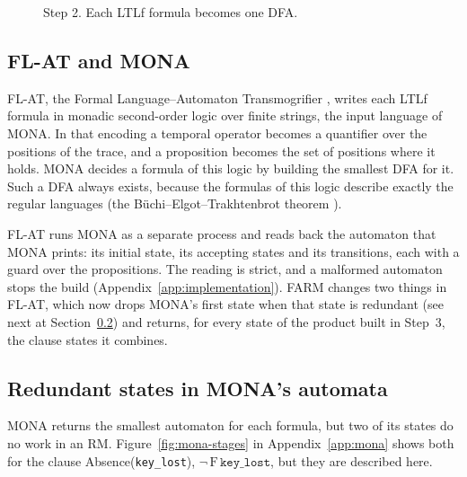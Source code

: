 \documentclass[11pt,english,listoffigures,listoftables]{tfgetsinf}
\begin{document}
\begin{figure}[H]
\centering
{}
\caption[Step 2 of FARM]{Step 2. Each LTLf formula becomes one DFA.}
\label{fig:step2}
\end{figure}

\subsection{FL-AT and MONA}
FL-AT, the Formal Language--Automaton Transmogrifier \cite{transmogrifier2020}, writes each LTLf formula in monadic second-order logic over finite strings, the input language of MONA. In that encoding a temporal operator becomes a quantifier over the positions of the trace, and a proposition becomes the set of positions where it holds. MONA \cite{henriksen1995mona} decides a formula of this logic by building the smallest DFA for it. Such a DFA always exists, because the formulas of this logic describe exactly the regular languages (the Büchi--Elgot--Trakhtenbrot theorem \cite{buchi1960weak,elgot1961decision,trakhtenbrot1966finite}).

FL-AT runs MONA as a separate process and reads back the automaton that MONA prints: its initial state, its accepting states and its transitions, each with a guard over the propositions. The reading is strict, and a malformed automaton stops the build (Appendix~\ref{app:implementation}). FARM changes two things in FL-AT, which now drops MONA's first state when that state is redundant (see next at Section~\ref{sec:redundant}) and returns, for every state of the product built in Step~3, the clause states it combines.

\subsection{Redundant states in MONA's automata}
\label{sec:redundant}
MONA returns the smallest automaton for each formula, but two of its states do no work in an RM. Figure~\ref{fig:mona-stages} in Appendix~\ref{app:mona} shows both for the clause Absence(\texttt{key\_lost}), $\neg\,\mathrm{F}\,\texttt{key\_lost}$, but they are described here.
\end{document}
